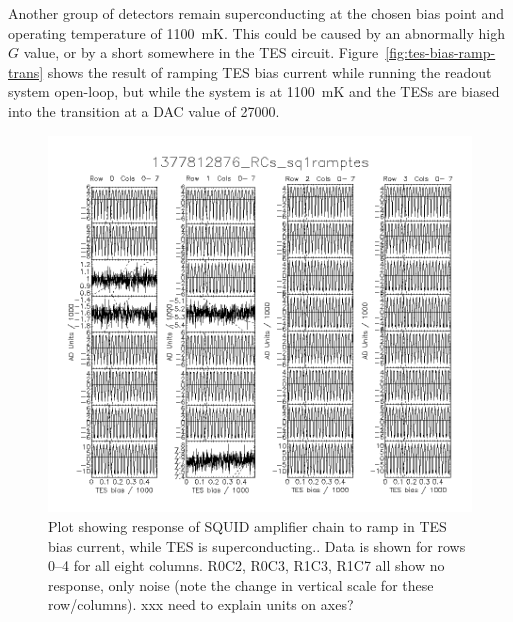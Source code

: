 \documentclass[10pt,twocolumn,article]{memoir}
\newcommand*{\figref}[1]{Figure~\ref{#1}}
\newcommand*{\TES}{{\small TES}\xspace}
\newcommand*{\TESs}{{\small TES}s\xspace}
\newcommand*{\RC}[2]{R{#1}C{#2}\xspace}
\begin{document}
Another group of detectors remain superconducting at the chosen bias point and operating temperature of 1100~mK.
This could be caused by an abnormally high $G$ value, or by a short somewhere in the \TES circuit.
\figref{fig:tes-bias-ramp-trans} shows the result of ramping \TES bias current while running the readout system open-loop, but while the system is at 1100~mK and the \TESs are biased into the transition at a DAC value of 27000.

\begin{figure}[th]
\centering
\includegraphics[width=\textwidth]{images/1377812876_RCs_sq1ramptes_00.png}
\caption{Plot showing response of SQUID amplifier chain to ramp in \TES bias current, while \TES is superconducting.. Data is shown for rows 0--4 for all eight columns. \RC{0}{2}, \RC{0}{3}, \RC{1}{3}, \RC{1}{7} all show no response, only noise (note the change in vertical scale for these row/columns). xxx need to explain units on axes?}
\label{fig:tes-bias-ramp-sc}
\end{figure}
\end{document}
